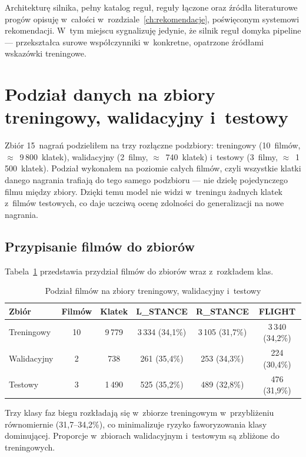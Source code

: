 Architekturę silnika, pełny katalog reguł, reguły łączone oraz źródła literaturowe progów opisuję w~całości w~rozdziale~\ref{ch:rekomendacje}, poświęconym systemowi rekomendacji. W~tym miejscu sygnalizuję jedynie, że silnik reguł domyka pipeline --- przekształca surowe współczynniki w~konkretne, opatrzone źródłami wskazówki treningowe.

\section{Podział danych na zbiory treningowy, walidacyjny i~testowy}
\label{sec:splity}

Zbiór 15~nagrań podzieliłem na trzy rozłączne podzbiory: treningowy (10~filmów, $\approx$~9\,800~klatek), walidacyjny (2~filmy, $\approx$~740~klatek) i~testowy (3~filmy, $\approx$~1\,500~klatek). Podział wykonałem na poziomie całych filmów, czyli wszystkie klatki danego nagrania trafiają do tego samego podzbioru --- nie dzielę pojedynczego filmu między zbiory. Dzięki temu model nie widzi w~treningu żadnych klatek z~filmów testowych, co daje uczciwą ocenę zdolności do generalizacji na nowe nagrania.

\subsection{Przypisanie filmów do zbiorów}
\label{sec:splity-przypisanie}

Tabela~\ref{tab:splits} przedstawia przydział filmów do zbiorów wraz z~rozkładem klas.

\begin{table}[htbp]
\centering
\caption{Podział filmów na zbiory treningowy, walidacyjny i~testowy}
\label{tab:splits}
\small
\begin{tabular}{lccccc}
\hline
\textbf{Zbiór} & \textbf{Filmów} & \textbf{Klatek} & \textbf{L\_STANCE} & \textbf{R\_STANCE} & \textbf{FLIGHT} \\
\hline
Treningowy  & 10 & 9\,779 & 3\,334 (34{,}1\%) & 3\,105 (31{,}7\%) & 3\,340 (34{,}2\%) \\
Walidacyjny &  2 &    738 &    261 (35{,}4\%) &    253 (34{,}3\%) &    224 (30{,}4\%) \\
Testowy     &  3 & 1\,490 &    525 (35{,}2\%) &    489 (32{,}8\%) &    476 (31{,}9\%) \\
\hline
\end{tabular}
\end{table}

Trzy klasy faz biegu rozkładają się w~zbiorze treningowym w~przybliżeniu równomiernie (31{,}7--34{,}2\%), co minimalizuje ryzyko faworyzowania klasy dominującej. Proporcje w~zbiorach walidacyjnym i~testowym są zbliżone do treningowych.

